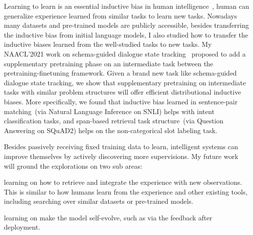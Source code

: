 Learning to learn is an essential inductive bias in human
intelligence~\cite{harlow1949formation}, human can generalize
experience learned from similar tasks to learn new tasks. Nowadays
many datasets and pre-trained models are publicly accessible, besides
transferring the inductive bias from initial language models, I also
studied how to transfer the inductive biases learned from the
well-studied tasks to new tasks. My NAACL'2021 work on schema-guided
dialogue state tracking~\cite{cao2021schema} proposed to add a
supplementary pretraining phase on an intermediate task between the
pretraining-finetuning framework. Given a brand new task like
schema-guided dialogue state tracking, we show that supplementary
pretraining on intermediate tasks with similar problem structures will
offer efficient distributional inductive biases. More specifically, we
found that inductive bias learned in sentence-pair matching~(via
Natural Language Inference on SNLI) helps with intent classification
tasks, and span-based retrieval task structure~(via Question Answering
on SQuAD2) helps on the non-categorical slot labeling task.

Besides passively receiving fixed training data to learn, intelligent
systems can improve themselves by actively discovering more
supervisions. My future work will ground the explorations on two sub
areas:
\begin{inparaenum}[(a)]
\item learning on how to retrieve and integrate the experience with
  new observations. This is similar to how humans learn from the
  experience and other existing tools, including searching over
  similar datasets or pre-trained models.
\item learning on make the model self-evolve, such as via the
  feedback after deployment.
\end{inparaenum}


